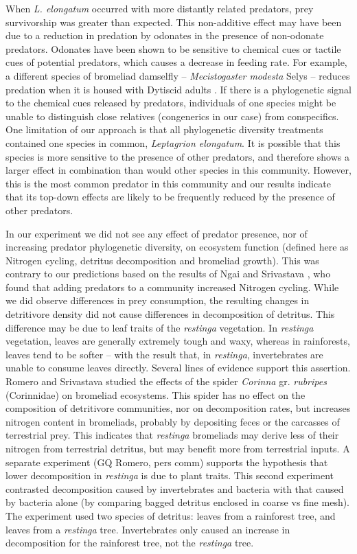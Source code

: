 When \emph{L. elongatum} occurred with more distantly related predators,
prey survivorship was greater than expected. This non-additive effect
may have been due to a reduction in predation by odonates in the
presence of non-odonate predators. Odonates have been shown to be
sensitive to chemical cues \citep{Barry2014} or tactile cues
\citep{Atwood2014} of potential predators, which causes a decrease in
feeding rate. For example, a different species of bromeliad damselfly --
\emph{Mecistogaster modesta} Selys -- reduces predation when it is
housed with Dytiscid adults \citep{Atwood2014}. If there is a
phylogenetic signal to the chemical cues released by predators,
individuals of one species might be unable to distinguish close
relatives (congenerics in our case) from conspecifics. One limitation of
our approach is that all phylogenetic diversity treatments contained one
species in common, \emph{Leptagrion elongatum}. It is possible that this
species is more sensitive to the presence of other predators, and
therefore shows a larger effect in combination than would other species
in this community. However, this is the most common predator in this
community and our results indicate that its top-down effects are likely
to be frequently reduced by the presence of other predators.

In our experiment we did not see any effect of predator presence, nor of
increasing predator phylogenetic diversity, on ecosystem function
(defined here as Nitrogen cycling, detritus decomposition and bromeliad
growth). This was contrary to our predictions based on the results of
Ngai and Srivastava \citeyearpar{Ngai2006}, who found that adding
predators to a community increased Nitrogen cycling. While we did
observe differences in prey consumption, the resulting changes in
detritivore density did not cause differences in decomposition of
detritus. This difference may be due to leaf traits of the
\emph{restinga} vegetation. In \emph{restinga} vegetation, leaves are
generally extremely tough and waxy, whereas in rainforests, leaves tend
to be softer -- with the result that, in \emph{restinga}, invertebrates
are unable to consume leaves directly. Several lines of evidence support
this assertion. Romero and Srivastava \citeyearpar{Romero2010} studied
the effects of the spider \emph{Corinna} gr. \emph{rubripes}
(Corinnidae) on bromeliad ecosystems. This spider has no effect on the
composition of detritivore communities, nor on decomposition rates, but
increases nitrogen content in bromeliads, probably by depositing feces
or the carcasses of terrestrial prey. This indicates that
\emph{restinga} bromeliads may derive less of their nitrogen from
terrestrial detritus, but may benefit more from terrestrial inputs. A
separate experiment (GQ Romero, pers comm) supports the hypothesis that
lower decomposition in \emph{restinga} is due to plant traits. This
second experiment contrasted decomposition caused by invertebrates and
bacteria with that caused by bacteria alone (by comparing bagged
detritus enclosed in coarse vs fine mesh). The experiment used two
species of detritus: leaves from a rainforest tree, and leaves from a
\emph{restinga} tree. Invertebrates only caused an increase in
decomposition for the rainforest tree, not the \emph{restinga} tree.

